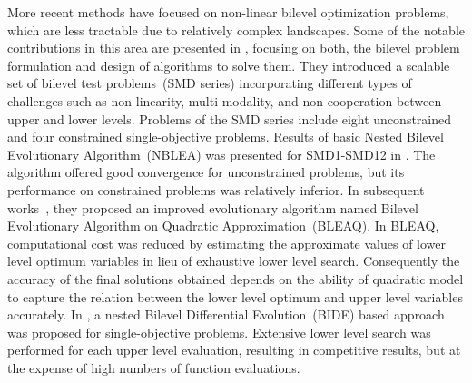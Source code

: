 More recent methods have focused on non-linear bilevel optimization problems, which are less tractable due to relatively complex landscapes. Some of the notable contributions in this area are presented in \cite{sinha2014test,sinha2013efficient,sinha_improved_2014,lu2016finding,suryan2016handling,sinha2014bilevel_par}, focusing on both, the bilevel problem formulation and design of algorithms to solve them. They introduced a scalable set of bilevel test problems~(SMD series) incorporating different types of challenges such as non-linearity, multi-modality, and non-cooperation between upper and lower levels. Problems of the SMD series include eight unconstrained and four constrained single-objective problems. Results of basic Nested Bilevel Evolutionary Algorithm~(NBLEA) was presented for SMD1-SMD12 in \cite{sinha2014test}. The algorithm offered good convergence for unconstrained problems, but its performance on constrained problems was relatively inferior. In subsequent works~\cite{sinha2013efficient,sinha_improved_2014}, they proposed an improved evolutionary algorithm named Bilevel Evolutionary Algorithm on Quadratic Approximation~(BLEAQ). In BLEAQ, computational cost was reduced by estimating the approximate values of lower level optimum variables in lieu of exhaustive lower level search. Consequently the accuracy of the final solutions obtained depends on the ability of quadratic model to capture the relation between the lower level optimum and upper level variables accurately. In \cite{Angelobilevel}, a nested Bilevel Differential Evolution~(BIDE) based approach was proposed for single-objective problems. Extensive lower level search was performed for each upper level evaluation, resulting in competitive results, but at the expense of high numbers of function evaluations. 

